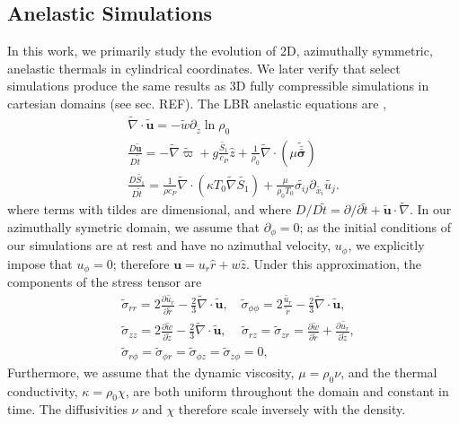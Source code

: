 \documentclass[twocolumn, amsmath, amsfonts, amssymb, trackchanges]{aastex62}
\newcommand{\td}[1]{\ensuremath{\widetilde{#1}}}
\newcommand{\grad}{\ensuremath{\nabla}}
\newcommand{\lilstressT}{\ensuremath{\bm{\bar{\bar{\sigma}}}}}
\begin{document}
\subsection{Anelastic Simulations}
In this work, we primarily study the evolution of 2D, azimuthally symmetric, anelastic thermals in cylindrical coordinates. 
We later verify that select simulations produce the same results as 3D fully compressible simulations in cartesian domains (see sec. REF). 
The LBR anelastic equations are \citep{lecoanet&all2014},
\begin{gather}
\td{\grad}\cdot\td{\bm{u}} = -\td{w}\partial_{\tilde{z}} \ln\rho_0 
\label{eqn:AN_continuity_full}\\
\frac{D \td{\bm{u}}}{D \td{t}} = -\td{\grad} \td{\varpi} + g\frac{\td{S_1}}{c_P}\hat{z} + \frac{1}{\rho_0}\td{\grad}\cdot\left(\mu\td{\lilstressT}\right)
\label{eqn:AN_momentum_full}\\
\frac{D \td{S_1}}{D\td{t}} = \frac{1}{\rho c_P}\td{\grad}\cdot\left(\kappa T_0 \td{\grad} \td{S_1}\right) + \frac{\mu}{\rho_0 T_0}\td{\sigma_{ij}}\partial_{\td{x_i}}\td{u_j}
\label{eqn:AN_energy_full}.
\end{gather}
where terms with tildes are dimensional, and where $D/D\td{t} = \partial/\partial \td{t} + \td{\bm{u}}\cdot\td{\grad}$. 
In our azimuthally symetric domain, we assume that $\partial_\phi = 0$; as the initial conditions of our simulations are at rest and have no azimuthal velocity, $u_\phi$, we explicitly impose that $u_\phi = 0$; therefore $\bm{u} = u_r \hat{r} + w\hat{z}$. 
Under this approximation, the components of the stress tensor are
\begin{equation}
\begin{split}
&\td{\sigma}_{rr} = 2\frac{\partial \td{u_r}}{\partial \td{r}} - \frac{2}{3}\td{\grad}\cdot\td{\bm{u}},\,\,\,\,\,\,
\td{\sigma}_{\phi\phi} = 2\frac{\td{u_r}}{\td{r}} - \frac{2}{3}\td{\grad}\cdot\td{\bm{u}}, \\
&\td{\sigma}_{zz}       = 2\frac{\partial \td{w}}{\partial \td{z}} - \frac{2}{3}\td{\grad}\cdot\td{\bm{u}},\,\,\,\,\,\,\,
\td{\sigma}_{rz}     = \td{\sigma}_{zr} = \frac{\partial \td{w}}{\partial \td{r}} + \frac{\partial \td{u_r}}{\partial \td{z}}, \\
&\td{\sigma}_{r\phi}  = \td{\sigma}_{\phi r}  
 = \td{\sigma}_{\phi z} = \td{\sigma}_{z \phi}  = 0,\qquad
\end{split}
\end{equation}
Furthermore, we assume that the dynamic viscosity, $\mu = \rho_0 \nu$, and the thermal conductivity, $\kappa = \rho_0 \chi$, are both uniform throughout the domain and constant in time.
The diffusivities $\nu$ and $\chi$ therefore scale inversely with the density.
\end{document}
